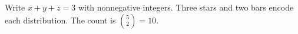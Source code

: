 Write $x+y+z=3$ with nonnegative integers. Three stars and two bars encode each distribution. The count is $\binom52=\boxed{10}$.
